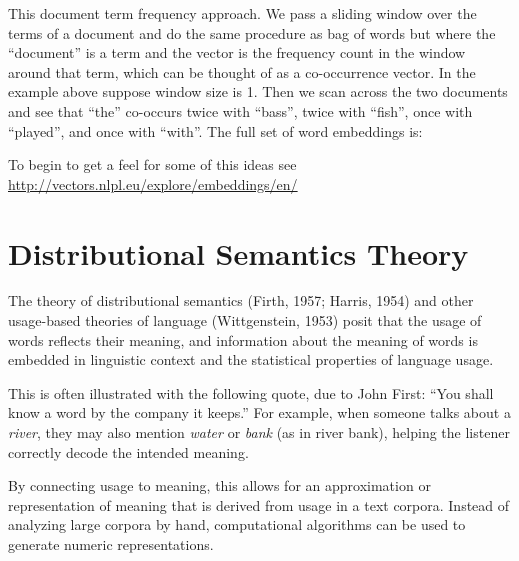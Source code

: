 This document term frequency approach. We pass a sliding window over the terms of a document and do the same procedure as bag of words but where the ``document'' is a term and the vector is the frequency count in the window around that term, which can be thought of as a co-occurrence vector.  In the example above suppose window size is 1.  Then we scan across the two documents and see that ``the'' co-occurs twice with ``bass'',  twice with ``fish'', once with ``played'', and once with ``with''.  The full set of word embeddings is:


To begin to get a feel for some of this ideas see \url{http://vectors.nlpl.eu/explore/embeddings/en/}
 
\section{Distributional Semantics Theory}


The theory of distributional semantics (Firth, 1957; Harris, 1954) and other usage-based theories of language (Wittgenstein, 1953) posit that the usage of words reflects their meaning, and information about the meaning of words is embedded in linguistic context and the statistical properties of language usage.

This is often illustrated with the following quote, due to John First: ``You shall know a word by the company it keeps.'' For example, when someone talks about a \textit{river}, they may also mention \textit{water} or \textit{bank} (as in river bank), helping the listener correctly decode the intended meaning.

By connecting usage to meaning, this allows for an approximation or representation of meaning that is derived from usage in a text corpora. Instead of analyzing large corpora by hand, computational algorithms can be used to generate numeric representations.

